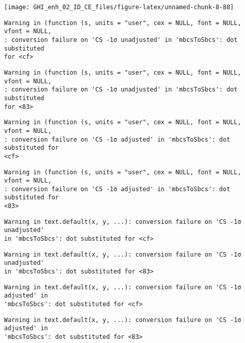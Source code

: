 \documentclass[
  10pt,
  a4paper,oneside]{article}
\begin{document}
\begin{center}\texttt{[image: GHI\_enh\_02\_ID\_CE\_files/figure-latex/unnamed-chunk-8-88]} \end{center}

\begin{verbatim}
Warning in (function (s, units = "user", cex = NULL, font = NULL, vfont = NULL,
: conversion failure on 'CS -1σ unadjusted' in 'mbcsToSbcs': dot substituted
for <cf>
\end{verbatim}

\begin{verbatim}
Warning in (function (s, units = "user", cex = NULL, font = NULL, vfont = NULL,
: conversion failure on 'CS -1σ unadjusted' in 'mbcsToSbcs': dot substituted
for <83>
\end{verbatim}

\begin{verbatim}
Warning in (function (s, units = "user", cex = NULL, font = NULL, vfont = NULL,
: conversion failure on 'CS -1σ adjusted' in 'mbcsToSbcs': dot substituted for
<cf>
\end{verbatim}

\begin{verbatim}
Warning in (function (s, units = "user", cex = NULL, font = NULL, vfont = NULL,
: conversion failure on 'CS -1σ adjusted' in 'mbcsToSbcs': dot substituted for
<83>
\end{verbatim}

\begin{verbatim}
Warning in text.default(x, y, ...): conversion failure on 'CS -1σ unadjusted'
in 'mbcsToSbcs': dot substituted for <cf>
\end{verbatim}

\begin{verbatim}
Warning in text.default(x, y, ...): conversion failure on 'CS -1σ unadjusted'
in 'mbcsToSbcs': dot substituted for <83>
\end{verbatim}

\begin{verbatim}
Warning in text.default(x, y, ...): conversion failure on 'CS -1σ adjusted' in
'mbcsToSbcs': dot substituted for <cf>
\end{verbatim}

\begin{verbatim}
Warning in text.default(x, y, ...): conversion failure on 'CS -1σ adjusted' in
'mbcsToSbcs': dot substituted for <83>
\end{verbatim}
\end{document}
